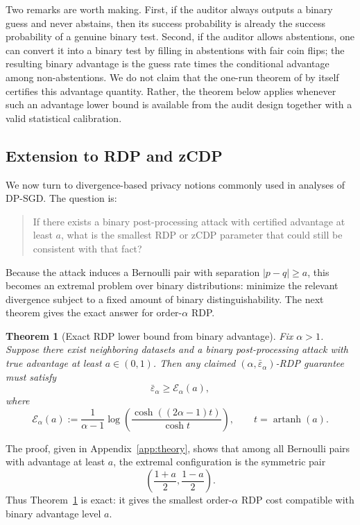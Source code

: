 \documentclass[10pt]{article}
\newtheorem{theorem}{Theorem}[section]
\newcommand{\epsbar}{\bar\varepsilon}
\begin{document}
Two remarks are worth making. First, if the auditor always outputs a binary guess and never abstains, then its success probability is already the success probability of a genuine binary test. Second, if the auditor allows abstentions, one can convert it into a binary test by filling in abstentions with fair coin flips; the resulting binary advantage is the guess rate times the conditional advantage among non-abstentions. We do not claim that the one-run theorem of \cite{steinke2023privacy} by itself certifies this advantage quantity. Rather, the theorem below applies whenever such an advantage lower bound is available from the audit design together with a valid statistical calibration.

\subsection{Extension to RDP and zCDP}

We now turn to divergence-based privacy notions commonly used in analyses of DP-SGD. The question is:
\begin{quote}
If there exists a binary post-processing attack with certified advantage at least $a$, what is the smallest RDP or zCDP parameter that could still be consistent with that fact?
\end{quote}

Because the attack induces a Bernoulli pair with separation $|p-q| \ge a$, this becomes an extremal problem over binary distributions: minimize the relevant divergence subject to a fixed amount of binary distinguishability. The next theorem gives the exact answer for order-$\alpha$ RDP.

\begin{theorem}[Exact RDP lower bound from binary advantage]
\label{thm:rdp}
Fix $\alpha>1$. Suppose there exist neighboring datasets and a binary post-processing attack with true advantage at least $a\in(0,1)$. Then any claimed $(\alpha,\epsbar_\alpha)$-RDP guarantee must satisfy
\[
\epsbar_\alpha \ge \mathcal E_\alpha(a),
\]
where
\[
\mathcal E_\alpha(a):=
\frac{1}{\alpha-1}
\log\!\left(
\frac{\cosh((2\alpha-1)t)}{\cosh t}
\right),
\qquad
t=\operatorname{artanh}(a).
\]
\end{theorem}

The proof, given in Appendix~\ref{app:theory}, shows that among all Bernoulli pairs with advantage at least $a$, the extremal configuration is the symmetric pair
\[
\left(\frac{1+a}{2},\frac{1-a}{2}\right).
\]
Thus Theorem~\ref{thm:rdp} is exact: it gives the smallest order-$\alpha$ RDP cost compatible with binary advantage level $a$.
\end{document}
